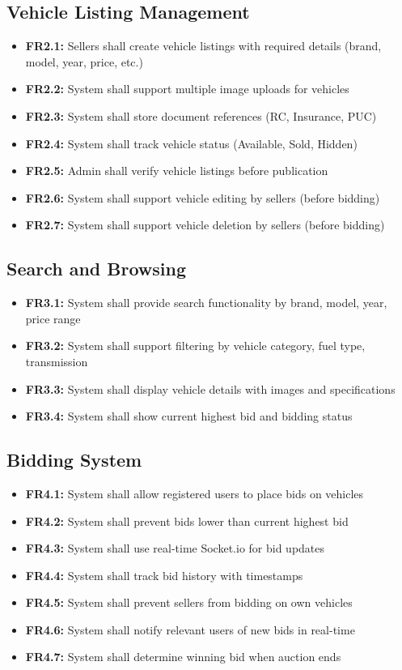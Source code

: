 \documentclass[12pt,a4paper]{report}
\begin{document}
\subsection{Vehicle Listing Management}
\begin{itemize}
    \item \textbf{FR2.1:} Sellers shall create vehicle listings with required details (brand, model, year, price, etc.)
    \item \textbf{FR2.2:} System shall support multiple image uploads for vehicles
    \item \textbf{FR2.3:} System shall store document references (RC, Insurance, PUC)
    \item \textbf{FR2.4:} System shall track vehicle status (Available, Sold, Hidden)
    \item \textbf{FR2.5:} Admin shall verify vehicle listings before publication
    \item \textbf{FR2.6:} System shall support vehicle editing by sellers (before bidding)
    \item \textbf{FR2.7:} System shall support vehicle deletion by sellers (before bidding)
\end{itemize}

\subsection{Search and Browsing}
\begin{itemize}
    \item \textbf{FR3.1:} System shall provide search functionality by brand, model, year, price range
    \item \textbf{FR3.2:} System shall support filtering by vehicle category, fuel type, transmission
    \item \textbf{FR3.3:} System shall display vehicle details with images and specifications
    \item \textbf{FR3.4:} System shall show current highest bid and bidding status
\end{itemize}

\subsection{Bidding System}
\begin{itemize}
    \item \textbf{FR4.1:} System shall allow registered users to place bids on vehicles
    \item \textbf{FR4.2:} System shall prevent bids lower than current highest bid
    \item \textbf{FR4.3:} System shall use real-time Socket.io for bid updates
    \item \textbf{FR4.4:} System shall track bid history with timestamps
    \item \textbf{FR4.5:} System shall prevent sellers from bidding on own vehicles
    \item \textbf{FR4.6:} System shall notify relevant users of new bids in real-time
    \item \textbf{FR4.7:} System shall determine winning bid when auction ends
\end{itemize}
\end{document}
